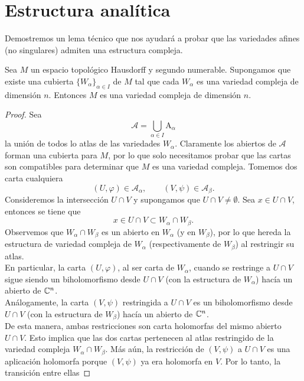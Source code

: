 \section{Estructura analítica}
    
Demostremos un lema técnico que nos ayudará a probar que las variedades afines (no singulares) admiten una estructura compleja.


\begin{lemma}\label{lemacubierta}
	Sea $M$ un espacio topológico Hausdorff y segundo numerable. Supongamos que existe una cubierta $\{W_\alpha\}_{\alpha\in I}$ de $M$ tal que cada $W_\alpha$ es una variedad compleja de dimensión $n$. Entonces $M$ es una variedad compleja de dimensión $n$.
\end{lemma}
\begin{proof}
	Sea 
	\begin{equation*}
		\mathcal{A}=\bigcup_{\alpha\in I}\mathrm{A}_\alpha
	\end{equation*}
	la unión de todos lo atlas de las variedades $W_\alpha$.
	Claramente los abiertos de $\mathcal{A}$ forman una cubierta para $M$, por lo que solo necesitamos probar que las cartas son compatibles para determinar que $M$ es una variedad compleja. Tomemos dos carta cualquiera
	\begin{equation*}
		    		(U,\varphi)\in\mathcal{A}_\alpha,\qquad (V,\psi)\in\mathcal{A}_\beta.
	\end{equation*}
	Consideremos la intersección $U\cap V$ y supongamos que $U\cap V\neq\emptyset$. Sea $x\in U\cap V$, entonces se tiene que
	\begin{equation*}
		x\in U\cap V\subset W_\alpha\cap W_\beta.
	\end{equation*}
	Observemos que $W_\alpha\cap W_\beta$ es un abierto en $W_\alpha$ (y en $W_\beta$), por lo que hereda la estructura de variedad compleja de $W_\alpha$ (respectivamente de $W_\beta$) al restringir su atlas.\\
	En particular, la carta $(U,\varphi)$, al ser carta de $W_\alpha$, cuando se restringe a $U\cap V$ sigue siendo un biholomorfismo desde $U\cap V$ (con la estructura de $W_\alpha$) hacía un abierto de $\mathbb{C}^n$.\\
	Análogamente, la carta $ (V,\psi)$ restringida a $U\cap V$ es un biholomorfismo desde $U\cap V$ (con la estructura de $W_\beta$) hacía un abierto de $\mathbb{C}^n$.\\
	De esta manera, ambas restricciones son carta holomorfas del mismo abierto $U\cap V$. Esto implica que las dos cartas pertenecen al atlas restringido de la variedad compleja $W_\alpha\cap W_\beta$. Más aún, la restricción de $(V,\psi)$ a $U\cap V$ es una aplicación holomorfa porque $(V,\psi)$ ya era holomorfa en $V$. Por lo tanto, la transición entre ellas

\end{proof}
